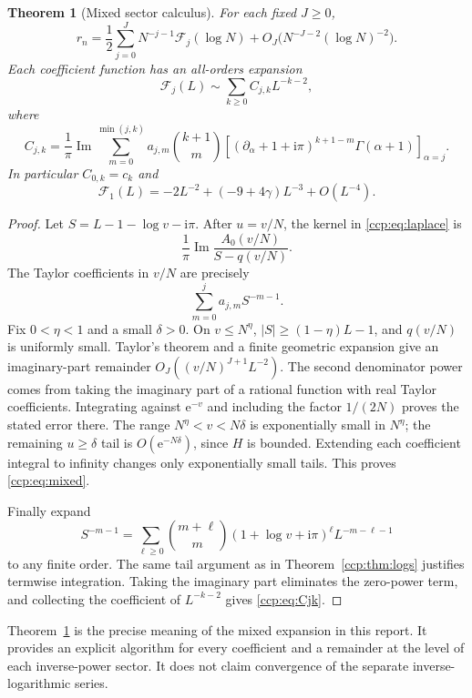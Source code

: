 \documentclass[11pt,letterpaper]{article}
\newtheorem{theorem}{Theorem}[section]
\theoremstyle{remark}\newtheorem{remark}[theorem]{Remark}
\newcommand{\ii}{\mathrm i}
\newcommand{\im}{\operatorname{Im}}
\newcommand{\ee}{\mathrm e}
\begin{document}
\begin{theorem}[Mixed sector calculus]\label{ccp:thm:mixed}
For each fixed $J\ge0$,
\begin{equation}
r_n=\frac12\sum_{j=0}^JN^{-j-1}\mathcal F_j(\log N)
       +O_J\bigl(N^{-J-2}(\log N)^{-2}\bigr).\label{ccp:eq:mixed}
\end{equation}
Each coefficient function has an all-orders expansion
\begin{equation}
\mathcal F_j(L)\sim\sum_{k\ge0}C_{j,k}L^{-k-2},\label{ccp:eq:Fexp}
\end{equation}
where
\begin{equation}
C_{j,k}=\frac1\pi\im\sum_{m=0}^{\min(j,k)}a_{j,m}\binom{k+1}{m}
\left[(\partial_\alpha+1+\ii\pi)^{k+1-m}\Gamma(\alpha+1)\right]_{\alpha=j}.
\label{ccp:eq:Cjk}
\end{equation}
In particular $C_{0,k}=c_k$ and
\[
\mathcal F_1(L)=-2L^{-2}+(-9+4\gamma)L^{-3}+O(L^{-4}).
\]
\end{theorem}
\begin{proof}
Let $S=L-1-\log v-\ii\pi$. After $u=v/N$, the kernel in \eqref{ccp:eq:laplace} is
\[
\frac1\pi\im\frac{A_0(v/N)}{S-q(v/N)}.
\]
The Taylor coefficients in $v/N$ are precisely
\[
\sum_{m=0}^ja_{j,m}S^{-m-1}.
\]
Fix $0<\eta<1$ and a small $\delta>0$. On $v\le N^\eta$, $|S|\ge(1-\eta)L-1$, and $q(v/N)$ is uniformly small. Taylor's theorem and a finite geometric expansion give an imaginary-part remainder $O_J((v/N)^{J+1}L^{-2})$. The second denominator power comes from taking the imaginary part of a rational function with real Taylor coefficients. Integrating against $\ee^{-v}$ and including the factor $1/(2N)$ proves the stated error there. The range $N^\eta<v<N\delta$ is exponentially small in $N^\eta$; the remaining $u\ge\delta$ tail is $O(\ee^{-N\delta})$, since $H$ is bounded. Extending each coefficient integral to infinity changes only exponentially small tails. This proves \eqref{ccp:eq:mixed}.

Finally expand
\[
S^{-m-1}=\sum_{\ell\ge0}\binom{m+\ell}{m}
(1+\log v+\ii\pi)^\ell L^{-m-\ell-1}
\]
to any finite order. The same tail argument as in Theorem~\ref{ccp:thm:logs} justifies termwise integration. Taking the imaginary part eliminates the zero-power term, and collecting the coefficient of $L^{-k-2}$ gives \eqref{ccp:eq:Cjk}.
\end{proof}

Theorem~\ref{ccp:thm:mixed} is the precise meaning of the mixed expansion in this report. It provides an explicit algorithm for every coefficient and a remainder at the level of each inverse-power sector. It does not claim convergence of the separate inverse-logarithmic series.
\end{document}
